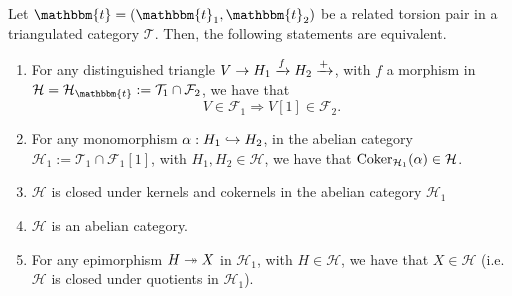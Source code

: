 \begin{thm}\label{thm:2.9}
  Let $\mathbbm{t}=(\mathbbm{t}_1,\mathbbm{t}_2)$ be a related torsion pair in a triangulated
  category $\mathcal{T}$. Then, the following statements are equivalent.
  \begin{enumerate}[label=(\alph*)]
    \item For any distinguished triangle $V\to H_1\xrightarrow{f}H_2\xrightarrow{+}$, with
      $f$ a morphism in $\mathcal{H}=\mathcal{H}_\mathbbm{t}:=\mathcal{T}_1\cap\mathcal{F}_2$,
      we have that
      \begin{equation*}
        V\in\mathcal{F}_1 \Rightarrow V[1]\in\mathcal{F}_2.
      \end{equation*}
    \item For any monomorphism $\alpha:H_1\hookrightarrow H_2$, in the abelian category
      $\mathcal{H}_1:=\mathcal{T}_1\cap\mathcal{F}_1[1]$, with $H_1,H_2\in\mathcal{H}$,
      we have that $\operatorname{Coker}_{\mathcal{H}_1}(\alpha)\in\mathcal{H}$.
    \item $\mathcal{H}$ is closed under kernels and cokernels in the abelian category
      $\mathcal{H}_1$
    \item $\mathcal{H}$ is an abelian category.
    \item For any epimorphism $H\twoheadrightarrow X$ in $\mathcal{H}_1$, with $H\in\mathcal{H}$,
      we have that $X\in\mathcal{H}$ (i.e. $\mathcal{H}$ is closed under quotients in $\mathcal{H}_1$).
  \end{enumerate}
\end{thm}

